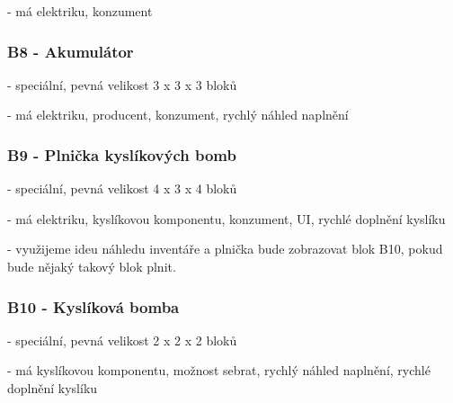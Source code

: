 - má elektriku, konzument
\subsubsection{B8 - Akumulátor}
- speciální, pevná velikost 3 x 3 x 3 bloků

- má elektriku, producent, konzument, rychlý náhled naplnění
\subsubsection{B9 - Plnička kyslíkových bomb}
- speciální, pevná velikost 4 x 3 x 4 bloků

- má elektriku, kyslíkovou komponentu, konzument, UI, rychlé doplnění kyslíku

- využijeme ideu náhledu inventáře a plnička bude zobrazovat blok B10, pokud bude nějaký takový blok plnit.

\subsubsection{B10 - Kyslíková bomba}
- speciální, pevná velikost 2 x 2 x 2 bloků

- má kyslíkovou komponentu, možnost sebrat, rychlý náhled naplnění, rychlé doplnění kyslíku


